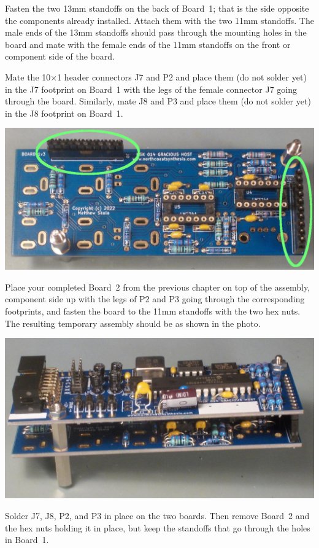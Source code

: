 Fasten the two 13mm standoffs on the back of Board~1; that is the side
opposite the components already installed.  Attach them with the two 11mm
standoffs.  The male ends of the 13mm standoffs should pass through the
mounting holes in the board and mate with the female ends of the 11mm
standoffs on the front or component side of the board.

Mate the 10$\times$1 header connectors J7 and P2 and place them (do not
solder yet) in the J7 footprint on Board~1 with the legs of the female
connector J7 going through the board.  Similarly, mate J8 and P3 and place
them (do not solder yet) in the J8 footprint on Board~1.

\nopagebreak
\noindent\includegraphics[width=\linewidth]{board-to-board.jpg}

Place your completed Board~2 from the previous chapter on top of the
assembly, component side up with the legs of P2 and P3 going through the
corresponding footprints, and fasten the board to the 11mm standoffs with
the two hex nuts.  The resulting temporary assembly should be as shown in
the photo.

\nopagebreak
\noindent\includegraphics[width=\linewidth]{temp-assy.jpg}

Solder J7, J8, P2, and P3 in place on the two boards.  Then remove Board~2
and the hex nuts holding it in place, but keep the standoffs that go through
the holes in Board~1.

